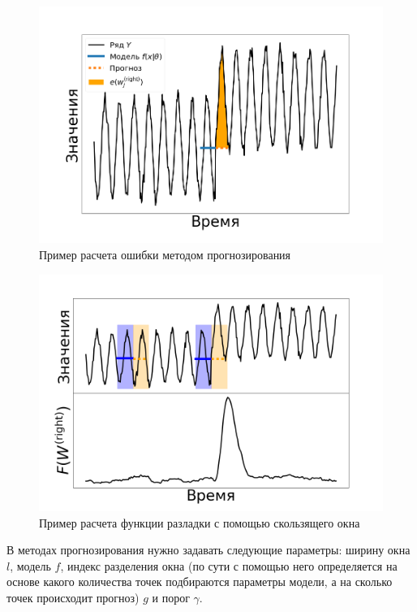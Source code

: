\documentclass[%
12pt,
master,  %
natbib,      %
subf,        %
substylefile = spbu.rtx,
href,        %
colorlinks,  %
]{disser}
\begin{document}
\begin{figure}[!hhh]
	\begin{center}
		\includegraphics[width=12cm]{approaches_first_4_ru}
	\end{center}
	\vspace{-5mm}\caption{Пример расчета ошибки методом прогнозирования}
	\label{fig:predicition_example_1}
\end{figure}

\begin{figure}[!hhh]
	\begin{center}
		\includegraphics[width=12cm]{approaches_first_6_ru}
	\end{center}
	\vspace{-5mm}\caption{Пример расчета функции разладки с помощью скользящего окна}
	\label{fig:predicition_example_2}
\end{figure}

В методах прогнозирования нужно задавать следующие параметры: ширину окна $l$, модель $f$, индекс разделения окна (по сути с помощью него определяется на основе какого количества точек подбираются параметры модели, а на сколько точек происходит прогноз) $g$ и порог $\gamma$.
\end{document}
